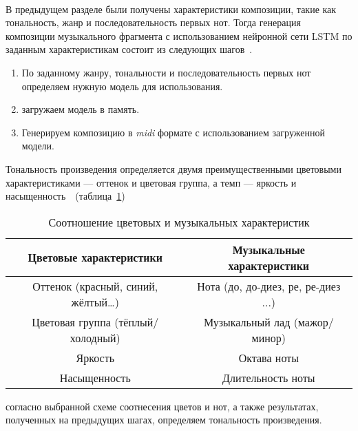
\\
В предыдущем разделе были получены характеристики композиции, такие как тональность, жанр и последовательность первых нот.
Тогда генерация композиции музыкального фрагмента с использованием нейронной сети LSTM по заданным характеристикам состоит из следующих шагов~\cite{nikitin2022}.

\begin{enumerate}
	\item По заданному жанру, тональности и последовательность первых нот определяем нужную модель для использования.
	\item загружаем модель в память.
	\item Генерируем композицию в \textit{midi} формате с использованием загруженной модели.
\end{enumerate}


Тональность произведения определяется двумя преимущественными цветовыми характеристиками --- оттенок и цветовая группа, а темп --- яркость и насыщенность~\cite{web}~(таблица~\ref{tab:color_music})

\begin{table}
	\centering
	\caption{Соотношение цветовых и музыкальных характеристик}
	\label{tab:color_music}
	\small 
	\begin{tabular}{|c|c|}
		\hline
		\textbf{Цветовые характеристики} & \textbf{Музыкальные характеристики} \\
		\hline
		Оттенок (красный, синий, жёлтый…) & Нота (до, до-диез, ре, ре-диез ...) \\
		\hline
		Цветовая группа (тёплый/холодный) & Музыкальный лад (мажор/минор) \\
		\hline
		Яркость & Октава ноты \\
		\hline
		Насыщенность & Длительность ноты \\
		\hline
	\end{tabular}
\end{table}

 согласно выбранной схеме соотнесения цветов и нот, а также результатах, полученных на предыдущих шагах, определяем тональность произведения.
 
 
\fi